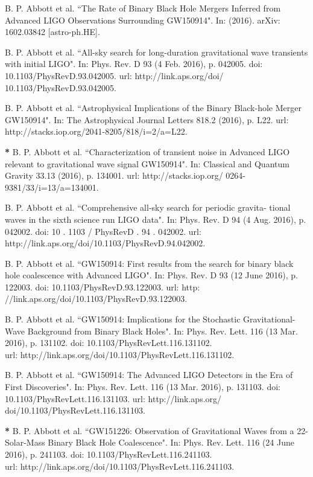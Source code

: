 B. P. Abbott et al. ``The Rate of Binary Black Hole Mergers Inferred
from Advanced LIGO Observations Surrounding GW150914". In: (2016).
arXiv: 1602.03842 [astro-ph.HE].

B. P. Abbott et al. ``All-sky search for long-duration gravitational wave
transients with initial LIGO". In: Phys. Rev. D 93 (4 Feb. 2016), p. 042005.
doi: 10.1103/PhysRevD.93.042005. url: http://link.aps.org/doi/
10.1103/PhysRevD.93.042005.

B. P. Abbott et al. ``Astrophysical Implications of the Binary Black-hole
Merger GW150914". In: The Astrophysical Journal Letters 818.2 (2016),
p. L22. url: http://stacks.iop.org/2041-8205/818/i=2/a=L22.

\textbf{*} B. P. Abbott et al. ``Characterization of transient noise in Advanced LIGO
relevant to gravitational wave signal GW150914". In: Classical and Quantum Gravity 33.13 (2016), p. 134001. url: http://stacks.iop.org/
0264-9381/33/i=13/a=134001.

B. P. Abbott et al. ``Comprehensive all-sky search for periodic gravita-
tional waves in the sixth science run LIGO data". In: Phys. Rev. D 94
(4 Aug. 2016), p. 042002. doi: 10 . 1103 / PhysRevD . 94 . 042002. url:
http://link.aps.org/doi/10.1103/PhysRevD.94.042002.

B. P. Abbott et al. ``GW150914: First results from the search for binary
black hole coalescence with Advanced LIGO". In: Phys. Rev. D 93 (12
June 2016), p. 122003. doi: 10.1103/PhysRevD.93.122003. url: http:
//link.aps.org/doi/10.1103/PhysRevD.93.122003.

B. P. Abbott et al. ``GW150914: Implications for the Stochastic Gravitational-
Wave Background from Binary Black Holes". In: Phys. Rev. Lett. 116 (13
Mar. 2016), p. 131102. doi: 10.1103/PhysRevLett.116.131102. \\ url:
http://link.aps.org/doi/10.1103/PhysRevLett.116.131102.

B. P. Abbott et al. ``GW150914: The Advanced LIGO Detectors in the Era
of First Discoveries". In: Phys. Rev. Lett. 116 (13 Mar. 2016), p. 131103.
doi: 10.1103/PhysRevLett.116.131103. url: http://link.aps.org/
doi/10.1103/PhysRevLett.116.131103.

\textbf{*} B. P. Abbott et al. ``GW151226: Observation of Gravitational Waves from
a 22-Solar-Mass Binary Black Hole Coalescence". In: Phys. Rev. Lett. 116
(24 June 2016), p. 241103. doi: 10.1103/PhysRevLett.116.241103. \\ url:
http://link.aps.org/doi/10.1103/PhysRevLett.116.241103.

